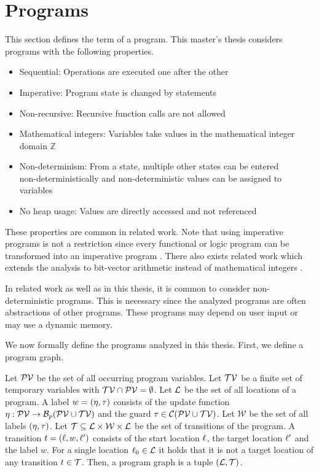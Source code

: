 \section{Programs}

This section defines the term of a program.
This master's thesis considers programs with the following properties.

\begin{itemize}
\item Sequential: Operations are executed one after the other
\item Imperative: Program state is changed by statements
\item Non-recursive: Recursive function calls are not allowed
\item Mathematical integers: Variables take values in the mathematical integer domain $\mathbb{Z}$
\item Non-determinism: From a state, multiple other states can be entered \\ non-deterministically and non-deterministic values can be assigned to variables
\item No heap usage: Values are directly accessed and not referenced
\end{itemize}

These properties are common in related work.
Note that using imperative programs is not a restriction since every functional or logic program can be transformed into an imperative program \cite{equivalence_of_languages}.
There also exists related work which extends the analysis to bit-vector arithmetic instead of mathematical integers \cite{bitvectorarithmetic}.

In related work as well as in this thesis, it is common to consider non-deterministic programs.
This is necessary since the analyzed programs are often abstractions of other programs.
These programs may depend on user input or may use a dynamic memory.

We now formally define the programs analyzed in this thesis.
First, we define a program graph.

\begin{definition} 
  Let $\mathcal{PV}$ be the set of all occurring program variables.
  Let $\mathcal{TV}$ be a finite set of temporary variables with $\mathcal{TV} \cap \mathcal{PV} = \emptyset$.
  Let $\mathcal{L}$ be the set of all locations of a program.
  A label $w = (\eta, \tau)$ consists of the update function $\eta: \mathcal{PV} \rightarrow \mathcal{B}_p(\mathcal{PV} \cup \mathcal{TV})$ and the guard $\tau \in \mathcal{C}(\mathcal{PV} \cup \mathcal{TV})$.
  Let $\mathcal{W}$ be the set of all labels $(\eta, \tau)$.
  Let $\mathcal{T} \subseteq \mathcal{L} \times \mathcal{W} \times \mathcal{L}$ be the set of transitions of the program.
  A transition $t = (\ell, w, \ell')$ consists of the start location $\ell$, the target location $\ell'$ and the label $w$.
  For a single location $\ell_0 \in \mathcal{L}$ it holds that it is not a target location of any transition $t \in \mathcal{T}$.
  Then, a program graph is a tuple $(\mathcal{L}, \mathcal{T})$.
\end{definition}

